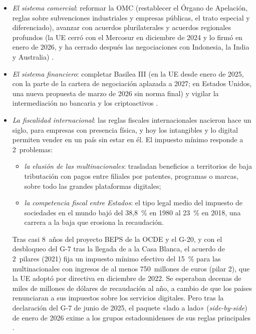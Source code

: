 \documentclass[11pt]{article}
\begin{document}
\begin{itemize}
\begin{itemize}
  \end{itemize}
\item \emph{El sistema comercial}: reformar la OMC (restablecer el Órgano de Apelación, reglas sobre subvenciones industriales y empresas públicas, el trato especial y diferenciado), avanzar con acuerdos plurilaterales y acuerdos regionales profundos (la UE cerró con el Mercosur en diciembre de 2024 y lo firmó en enero de 2026, y ha cerrado después las negociaciones con Indonesia, la India y Australia)  .
\item \emph{El sistema financiero}: completar Basilea III (en la UE desde enero de 2025, con la parte de la cartera de negociación aplazada a 2027; en Estados Unidos, una nueva propuesta de marzo de 2026 sin norma final) y vigilar la intermediación no bancaria y los criptoactivos\nocite{FSB2025NBFI} .
\item \emph{La fiscalidad internacional}: las reglas fiscales internacionales nacieron hace un siglo, para empresas con presencia física, y hoy los intangibles y lo digital permiten vender en un país sin estar en él. El impuesto mínimo responde a 2~problemas:
  \begin{itemize}
  \item \emph{la elusión de las multinacionales}: trasladan beneficios a territorios de baja tributación con pagos entre filiales por patentes, programas o marcas, sobre todo las grandes plataformas digitales;
  \item \emph{la competencia fiscal entre Estados}: el tipo legal medio del impuesto de sociedades en el mundo bajó del 38,8~\% en 1980 al 23~\% en 2018, una carrera a la baja que erosiona la recaudación\nocite{TaxFoundation2018Sociedades}.
  \end{itemize}
  Tras casi 8~años del proyecto BEPS de la OCDE y el G-20, y con el desbloqueo del G-7 tras la llegada de  a la Casa Blanca, el acuerdo de 2~pilares (2021) fija un impuesto mínimo efectivo del 15~\% para las multinacionales con ingresos de al menos 750~millones de euros (pilar 2), que la UE adoptó por directiva en diciembre de 2022\nocite{G20Roma2021}. Se esperaban decenas de miles de millones de dólares de recaudación al año, a cambio de que los países renunciaran a sus impuestos sobre los servicios digitales. Pero tras la declaración del G-7 de junio de 2025, el paquete «lado a lado» (\emph{side-by-side}) de enero de 2026 exime a los grupos estadounidenses de sus reglas principales\nocite{G72025Impuestos,OCDE2026SideBySide} .

\end{itemize}
\end{document}
